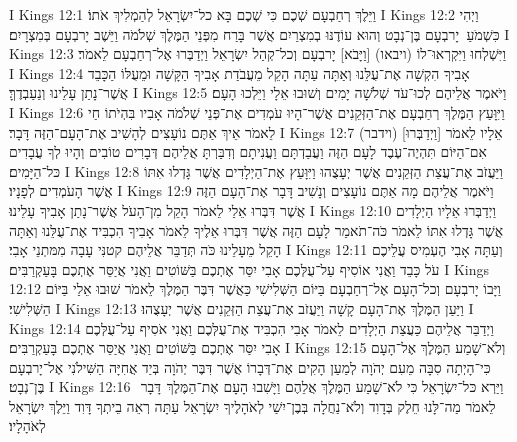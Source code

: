 I Kings 12:1	וַיֵּלֶךְ רְחַבְעָם שְׁכֶם כִּי שְׁכֶם בָּא כל־יִשְׂרָאֵל לְהַמְלִיךְ אֹתוֹ׃
I Kings 12:2	וַיְהִי כִּשְׁמֹעַ  יָרבְעָם בֶּן־נְבָט וְהוּא עוֹדֶנּוּ בְמִצְרַיִם אֲשֶׁר בָּרַח מִפְּנֵי הַמֶּלֶךְ שְׁלֹמֹה וַיֵּשֶׁב יָרבְעָם בְּמִצְרָיִם׃
I Kings 12:3	וַיִּשְׁלְחוּ וַיִּקְרְאוּ־לוֹ (ויבאו) [וַיָּבֹא] יָרבְעָם וְכל־קְהַל יִשְׂרָאֵל וַיְדַבְּרוּ אֶל־רְחַבְעָם לֵאמֹר׃
I Kings 12:4	אָבִיךָ הִקְשָׁה אֶת־עֻלֵּנוּ וְאַתָּה עַתָּה הָקֵל מֵעֲבֹדַת אָבִיךָ הַקָּשָׁה וּמֵעֻלּוֹ הַכָּבֵד אֲשֶׁר־נָתַן עָלֵינוּ וְנַעַבְדֶךָּ׃
I Kings 12:5	וַיֹּאמֶר אֲלֵיהֶם לְכוּ־עֹד שְׁלֹשָׁה יָמִים וְשׁוּבוּ אֵלָי וַיֵּלְכוּ הָעָם׃
I Kings 12:6	וַיִּוָּעַץ הַמֶּלֶךְ רְחַבְעָם אֶת־הַזְּקֵנִים אֲשֶׁר־הָיוּ עֹמְדִים אֶת־פְּנֵי שְׁלֹמֹה אָבִיו בִּהְיֹתוֹ חַי לֵאמֹר אֵיךְ אַתֶּם נוֹעָצִים לְהָשִׁיב אֶת־הָעָם־הַזֶּה דָּבָר׃
I Kings 12:7	(וידבר) [וַיְדַבְּרוּ] אֵלָיו לֵאמֹר אִם־הַיּוֹם תִּהְיֶה־עֶבֶד לָעָם הַזֶּה וַעֲבַדְתָּם וַעֲנִיתָם וְדִבַּרְתָּ אֲלֵיהֶם דְּבָרִים טוֹבִים וְהָיוּ לְךָ עֲבָדִים כּל־הַיָּמִים׃
I Kings 12:8	וַיַּעֲזֹב אֶת־עֲצַת הַזְּקֵנִים אֲשֶׁר יְעָצֻהוּ וַיִּוָּעַץ אֶת־הַיְלָדִים אֲשֶׁר גָּדְלוּ אִתּוֹ אֲשֶׁר הָעֹמְדִים לְפָנָיו׃
I Kings 12:9	וַיֹּאמֶר אֲלֵיהֶם מָה אַתֶּם נוֹעָצִים וְנָשִׁיב דָּבָר אֶת־הָעָם הַזֶּה אֲשֶׁר דִּבְּרוּ אֵלַי לֵאמֹר הָקֵל מִן־הָעֹל אֲשֶׁר־נָתַן אָבִיךָ עָלֵינוּ׃
I Kings 12:10	וַיְדַבְּרוּ אֵלָיו הַיְלָדִים אֲשֶׁר גָּדְלוּ אִתּוֹ לֵאמֹר כֹּה־תֹאמַר לָעָם הַזֶּה אֲשֶׁר דִּבְּרוּ אֵלֶיךָ לֵאמֹר אָבִיךָ הִכְבִּיד אֶת־עֻלֵּנוּ וְאַתָּה הָקֵל מֵעָלֵינוּ כֹּה תְּדַבֵּר אֲלֵיהֶם קטנִּי עָבָה מִמּתְנֵי אָבִי׃
I Kings 12:11	וְעַתָּה אָבִי הֶעְמִיס עֲלֵיכֶם עֹל כָּבֵד וַאֲנִי אוֹסִיף עַל־עֻלְּכֶם אָבִי יִסַּר אֶתְכֶם בַּשּׁוֹטִים וַאֲנִי אֲיַסֵּר אֶתְכֶם בָּעַקְרַבִּים׃
I Kings 12:12	וַיָּבוֹ יָרבְעָם וְכל־הָעָם אֶל־רְחַבְעָם בַּיּוֹם הַשְּׁלִישִׁי כַּאֲשֶׁר דִּבֶּר הַמֶּלֶךְ לֵאמֹר שׁוּבוּ אֵלַי בַּיּוֹם הַשְּׁלִישִׁי׃
I Kings 12:13	וַיַּעַן הַמֶּלֶךְ אֶת־הָעָם קָשָׁה וַיַּעֲזֹב אֶת־עֲצַת הַזְּקֵנִים אֲשֶׁר יְעָצֻהוּ׃
I Kings 12:14	וַיְדַבֵּר אֲלֵיהֶם כַּעֲצַת הַיְלָדִים לֵאמֹר אָבִי הִכְבִּיד אֶת־עֻלְּכֶם וַאֲנִי אֹסִיף עַל־עֻלְּכֶם אָבִי יִסַּר אֶתְכֶם בַּשּׁוֹטִים וַאֲנִי אֲיַסֵּר אֶתְכֶם בָּעַקְרַבִּים׃
I Kings 12:15	וְלֹא־שָׁמַע הַמֶּלֶךְ אֶל־הָעָם כִּי־הָיְתָה סִבָּה מֵעִם יְהֹוָה לְמַעַן הָקִים אֶת־דְּבָרוֹ אֲשֶׁר דִּבֶּר יְהֹוָה בְּיַד אֲחִיָּה הַשִּׁילֹנִי אֶל־יָרבְעָם בֶּן־נְבָט׃
I Kings 12:16	וַיַּרְא כּל־יִשְׂרָאֵל כִּי לֹא־שָׁמַע הַמֶּלֶךְ אֲלֵהֶם וַיָּשִׁבוּ הָעָם אֶת־הַמֶּלֶךְ  דָּבָר  לֵאמֹר מַה־לָּנוּ חֵלֶק בְּדָוִד וְלֹא־נַחֲלָה בְּבֶן־יִשַׁי לְאֹהָלֶיךָ יִשְׂרָאֵל עַתָּה רְאֵה בֵיתְךָ דָּוִד וַיֵּלֶךְ יִשְׂרָאֵל לְאֹהָלָיו׃
